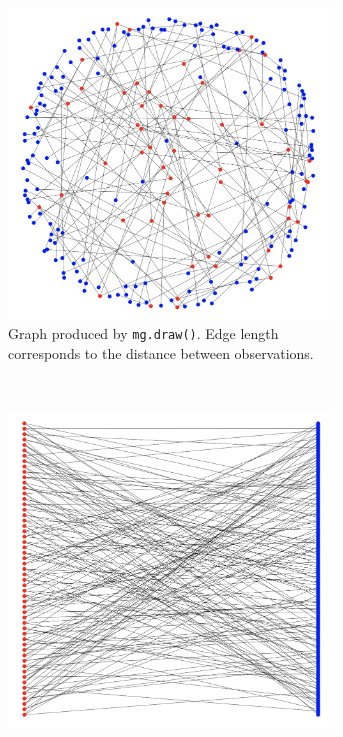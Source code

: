 \documentclass[11pt]{extarticle}
\begin{document}
\begin{figure}[h!]
    \centering
    \begin{subfigure}[t]{0.5\textwidth}
        \centering
        \includegraphics[width=0.95\textwidth]{./img/draw_examples/draw.png}
        \caption{Graph produced by \texttt{mg.draw()}. Edge length corresponds to the distance between observations.}
    \end{subfigure}%
    ~
    \begin{subfigure}[t]{0.5\textwidth}
        \centering
        \includegraphics[width=0.95\textwidth]{./img/draw_examples/draw_bipartite.png}

\end{subfigure}
\end{figure}
\end{document}
